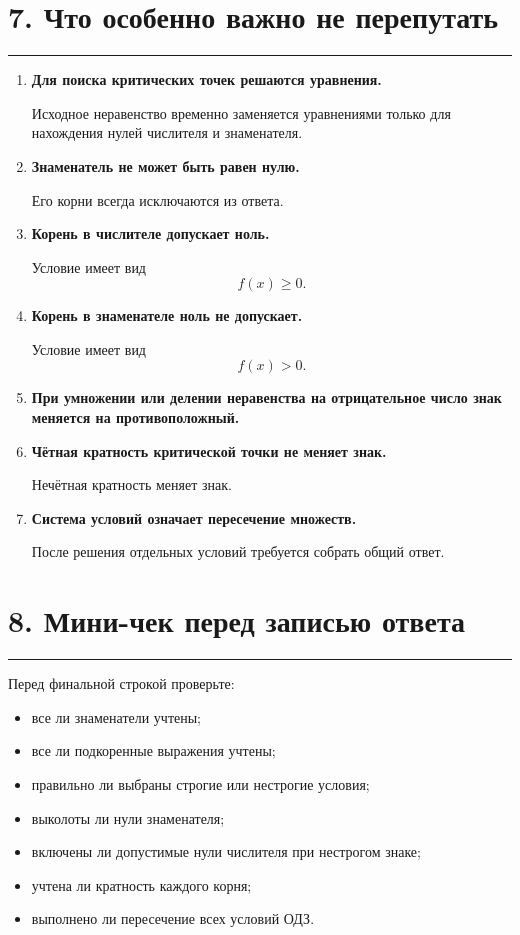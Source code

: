 \documentclass[a4paper,12pt]{article}
\newcommand{\topicsection}[1]{%
    \section*{\textcolor{darkaccent}{#1}}%
    \vspace{-0.4em}%
    \textcolor{accent}{\rule{\linewidth}{0.7pt}}%
    \vspace{0.4em}%
}
\newcommand{\key}[1]{%
    \textcolor{darkaccent}{\textbf{#1}}%
}
\begin{document}
\clearpage


\topicsection{7. Что особенно важно не перепутать}

\begin{enumerate}
    \item
    \key{Для поиска критических точек решаются уравнения.}
    Исходное неравенство временно заменяется уравнениями только для нахождения нулей числителя и знаменателя.

    \item
    \key{Знаменатель не может быть равен нулю.}
    Его корни всегда исключаются из ответа.

    \item
    \key{Корень в числителе допускает ноль.}
    Условие имеет вид
    \[
    f(x)\ge 0.
    \]

    \item
    \key{Корень в знаменателе ноль не допускает.}
    Условие имеет вид
    \[
    f(x)>0.
    \]

    \item
    \key{При умножении или делении неравенства на отрицательное число знак меняется на противоположный.}

    \item
    \key{Чётная кратность критической точки не меняет знак.}
    Нечётная кратность меняет знак.

    \item
    \key{Система условий означает пересечение множеств.}
    После решения отдельных условий требуется собрать общий ответ.
\end{enumerate}

\topicsection{8. Мини-чек перед записью ответа}

Перед финальной строкой проверьте:

\begin{itemize}
    \item все ли знаменатели учтены;
    \item все ли подкоренные выражения учтены;
    \item правильно ли выбраны строгие или нестрогие условия;
    \item выколоты ли нули знаменателя;
    \item включены ли допустимые нули числителя при нестрогом знаке;
    \item учтена ли кратность каждого корня;
    \item выполнено ли пересечение всех условий ОДЗ.
\end{itemize}
\end{document}
